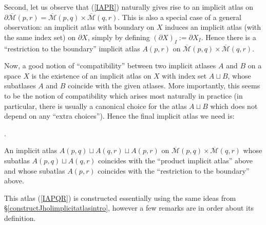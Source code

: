 \documentclass[12pt]{article}
\theoremstyle{definition}
\theoremstyle{remark}
\numberwithin{equation}{subsection}
\newcommand{\Mbar}{\overline{\mathcal M}}
\newcounter{rcounti}
\newenvironment{rlist}{\begin{list}{\roman{rcounti}.}{\usecounter{rcounti}
\setlength\itemsep{0pt}
\setlength\labelsep{4pt}
\setlength\labelwidth{16pt}
\setlength\leftmargin{32pt}
\setlength\listparindent{0pt}
\setlength\parsep{0pt}
\setlength\parskip{0pt}
\setlength\partopsep{0pt}
\setlength\rightmargin{0pt}
\setlength\topsep{0pt}
\setlength\itemindent{0pt}
}}{\end{list}}
\newcounter{rcountsave}
\newcommand{\rlistresume}{\setcounter{rcounti}{\value{rcountsave}}}
\begin{document}
Second, let us observe that (\ref{IAPR}) naturally gives rise to an implicit atlas on $\partial\Mbar(p,r)=\Mbar(p,q)\times\Mbar(q,r)$.  This is also a special case of a general observation: an implicit atlas with boundary on $X$ induces an implicit atlas (with the same index set) on $\partial X$, simply by defining $(\partial X)_I:=\partial X_I$.  Hence there is a ``restriction to the boundary'' implicit atlas $A(p,r)$ on $\Mbar(p,q)\times\Mbar(q,r)$.

Now, a good notion of ``compatibility'' between two implicit atlases $A$ and $B$ on a space $X$ is the existence of an implicit atlas on $X$ with index set $A\sqcup B$, whose subatlases $A$ and $B$ coincide with the given atlases.  More importantly, this seems to be the notion of compatibility which arises most naturally in practice (in particular, there is usually a canonical choice for the atlas $A\sqcup B$ which does not depend on any ``extra choices'').  Hence the final implicit atlas we need is:
\begin{rlist}
\rlistresume
\item\label{IAPQR}An implicit atlas $A(p,q)\sqcup A(q,r)\sqcup A(p,r)$ on $\Mbar(p,q)\times\Mbar(q,r)$ whose subatlas $A(p,q)\sqcup A(q,r)$ coincides with the ``product implicit atlas'' above and whose subatlas $A(p,r)$ coincides with the ``restriction to the boundary'' above.
\end{rlist}
This atlas (\ref{IAPQR}) is constructed essentially using the same ideas from \S\ref{constructJholimplicitatlasintro}, however a few remarks are in order about its definition.
\end{document}
